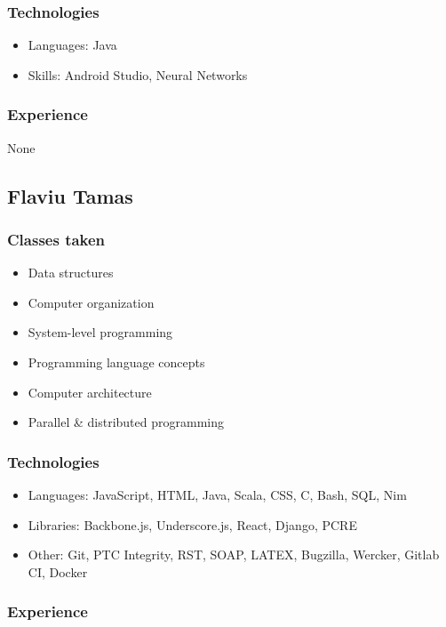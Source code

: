 \documentclass[
10pt, %
a4paper, %
oneside, %
headinclude,footinclude, %
BCOR5mm, %
]{scrartcl}
\begin{document}
\subsubsection{Technologies}

\begin{itemize}
\item
  Languages: Java
\item
  Skills: Android Studio, Neural Networks
\end{itemize}

\subsubsection{Experience}

None

\subsection{Flaviu Tamas}

\subsubsection{Classes taken}

\begin{itemize}
\item
  Data structures
\item
  Computer organization
\item
  System-level programming
\item
  Programming language concepts
\item
  Computer architecture
\item
  Parallel \& distributed programming
\end{itemize}

\subsubsection{Technologies}

\begin{itemize}
\item
  Languages: JavaScript, HTML, Java, Scala, CSS, C, Bash, SQL, Nim
\item
  Libraries: Backbone.js, Underscore.js, React, Django, PCRE
\item
  Other: Git, PTC Integrity, RST, SOAP, LATEX, Bugzilla, Wercker, Gitlab
  CI, Docker
\end{itemize}

\subsubsection{Experience}
\end{document}
